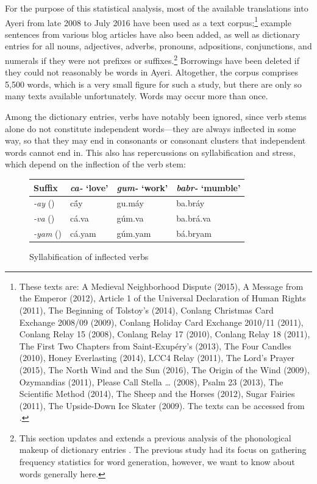 For the purpose of this statistical analysis, most of the available 
translations into Ayeri from late 2008 to July 2016 have been used as a text 
corpus;\footnote{These texts are:
A Medieval Neighborhood Dispute (2015),
A Message from the Emperor (2012),
Article 1 of the Universal Declaration of Human Rights (2011),
The Beginning of Tolstoy's  (2014),
Conlang Christmas Card Exchange 2008/09 (2009),
Conlang Holiday Card Exchange 2010/11 (2011),
Conlang Relay 15 (2008),
Conlang Relay 17 (2010),
Conlang Relay 18 (2011),
The First Two Chapters from Saint-Exupéry's  (2013),
The Four Candles (2010),
Honey Everlasting (2014),
LCC4 Relay (2011),
The Lord's Prayer (2015),
The North Wind and the Sun (2016),
The Origin of the Wind (2009),
Ozymandias (2011),
Please Call Stella … (2008),
Psalm 23 (2013),
The Scientific Method (2014),
The Sheep and the Horses (2012),
Sugar Fairies (2011),
The Upside-Down Ice Skater (2009).
The texts can be accessed from \citet[Examples]{benung}.\label{fn:phonocorpus}
} example sentences from 
various blog articles have also been added, as well as dictionary entries for 
all nouns, adjectives, adverbs, pronouns, adpositions, conjunctions, and 
numerals if they were not prefixes or suffixes.\footnote{This section updates 
and extends a previous analysis of the phonological makeup of dictionary 
entries 
\autocite{becker:frequency}. The previous study had its focus on gathering 
frequency statistics for word generation, however, we want to know about words 
generally here.} Borrowings have been deleted if they could not reasonably be 
words in Ayeri. Altogether, the corpus comprises 5,500 words, which is a very 
small figure for such a study, but there are only so many texts available 
unfortunately. Words may occur more than once.

Among the dictionary entries, verbs have notably been ignored, since verb stems 
alone do not constitute independent words---they are always inflected in some 
way, so that they may end in consonants or consonant clusters that independent 
words cannot end in. This also has repercussions on syllabification and stress, 
which depend on the inflection of the verb stem:

\begin{figure}[h]
\caption{Syllabification of inflected verbs}
\begin{tabu} to \linewidth {X[2l] X[3c] X[3c] X[3c]}
\toprule\tableheaderfont
Suffix
	& \emph{ca-} `love'
	& \emph{gum-} `work'
	& \emph{babr-} `mumble'
	\\

\toprule

\emph{-ay} (\Fsg{})
	& cā́y
	& gu.máy
	& ba.bráy
	\\

\emph{-va} (\Ssg{})
	& cá.va
	& gúm.va
	& ba.brá.va
	\\

\emph{-yam} (\Ptcp{})
	& cá.yam
	& gúm.yam
	& bá.bryam
	\\

\bottomrule
\end{tabu}
\label{fig:verbsyll}
\end{figure}


